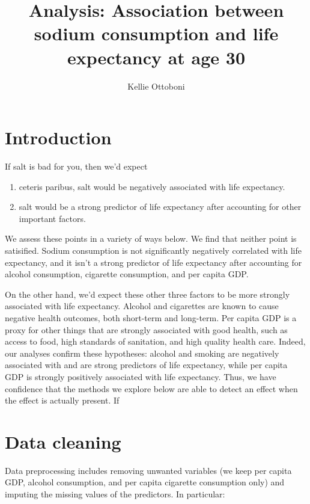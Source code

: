 \documentclass[11pt]{article}\usepackage[]{graphicx}\usepackage[]{color}
\title{Analysis: Association between sodium consumption and life expectancy at age 30}
\author{Kellie Ottoboni}
\begin{document}
\maketitle




\section{Introduction}
If salt is bad for you, then we'd expect 
\begin{enumerate}
\item ceteris paribus, salt would be negatively associated with life expectancy.
\item salt would be a strong predictor of life expectancy after accounting for other important factors.
\end{enumerate}
We assess these points in a variety of ways below.
We find that neither point is satisified.
Sodium consumption is not significantly negatively correlated with life expectancy, and it isn't a strong predictor of life expectancy after accounting for alcohol consumption, cigarette consumption, and per capita GDP.

On the other hand, we'd expect these other three factors to be more strongly associated with life expectancy.
Alcohol and cigarettes are known to cause negative health outcomes, both short-term and long-term.
Per capita GDP is a proxy for other things that are strongly associated with good health, such as access to food, high standards of sanitation, and high quality health care.
Indeed, our analyses confirm these hypotheses: alcohol and smoking are negatively associated with and are strong predictors of life expectancy, while per capita GDP is strongly positively associated with life expectancy.
Thus, we have confidence that the methods we explore below are able to detect an effect when the effect is actually present.
If

\section{Data cleaning}

Data preprocessing includes removing unwanted variables (we keep per capita GDP, alcohol consumption, and per capita cigarette consumption only) and imputing the missing values of the predictors. In particular:
\end{document}
